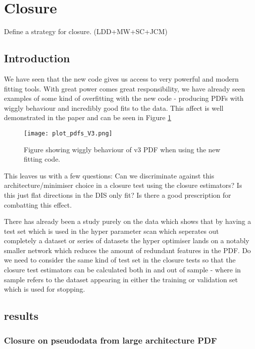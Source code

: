 \section{Closure}
\label{sec:closure}

Define a strategy for closure. (LDD+MW+SC+JCM)

\subsection{Introduction}

We have seen that the new \nfit code gives us access to very powerful and
modern fitting tools. With great power comes great responsibility, we have already
seen examples of some kind of overfitting with the new code - producing PDFs
with wiggly behaviour and incredibly good fits to the data. This affect is
well demonstrated in the \nfit paper and can be seen in Figure \ref{fig:v3pdf}

\begin{figure}[!h]
    \centering
    \texttt{[image: plot\_pdfs\_V3.png]}
    \caption{
        Figure showing wiggly behaviour of v3 PDF when using the new fitting code.
        }
    \label{fig:v3pdf}
\end{figure}

This leaves us with a few questions: Can we discriminate against this
architecture/minimiser choice in a closure test using the closure estimators?
Is this just flat directions in the DIS only fit? Is there a good prescription
for combatting this effect.

There has already been a study purely on the data which shows that by having a test
set which is used in the hyper parameter scan which seperates out completely a dataset
or series of datasets the hyper optimiser lands on a notably smaller network which reduces
the amount of redundant features in the PDF. Do we need to consider the same kind of test
set in the closure tests so that the closure test estimators can be calculated both in and
out of sample - where in sample refers to the dataset appearing in either the training
or validation set which is used for stopping.

\subsection{results}

\subsubsection*{Closure on pseudodata from large architecture PDF}

